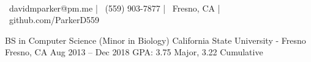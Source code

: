 \documentclass[]{awesome-cv}
\begin{document}
    
\begin{center}
	  \\
	\vspace{2mm}
	{\faEnvelope\ davidmparker@pm.me} | {\faMobile\ (559) 903-7877} | {\faMapMarker\ Fresno, CA} | {\faLink\ github.com/ParkerD559}
\end{center}
\begin{cventries}
	\cventry
	{BS in Computer Science (Minor in Biology)}
	{California State University - Fresno}
	{Fresno, CA}
	{Aug 2013 – Dec 2018}
	{GPA: 3.75 Major, 3.22 Cumulative}
\end{cventries}
\end{document}
